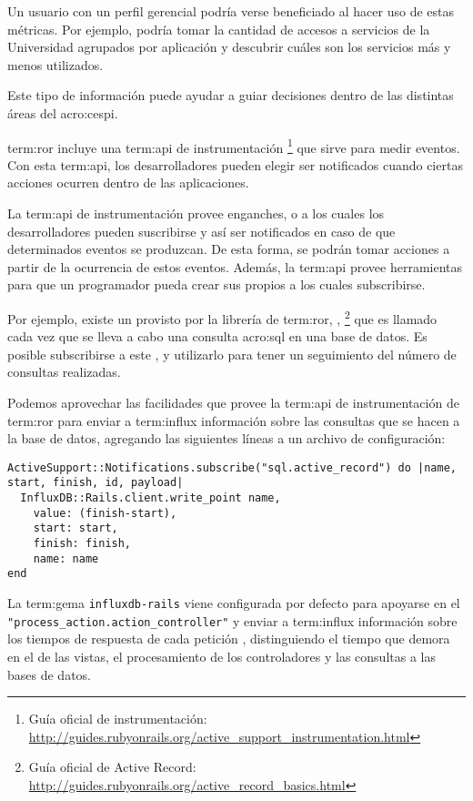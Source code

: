Un usuario con un perfil gerencial podría verse beneficiado al hacer uso de
estas métricas. Por ejemplo, podría tomar la cantidad de accesos a servicios de
la Universidad agrupados por aplicación y descubrir cuáles son los servicios
más y menos utilizados.

Este tipo de información puede ayudar a guiar decisiones dentro de las
distintas áreas del \gls{acro:cespi}.

\gls{term:ror} incluye una \gls{term:api} de instrumentación
\footnote{Guía oficial de instrumentación:
\url{http://guides.rubyonrails.org/active_support_instrumentation.html}}
que sirve para medir eventos. Con esta \gls{term:api}, los desarrolladores
pueden elegir ser notificados cuando ciertas acciones ocurren dentro de las
aplicaciones.

La \gls{term:api} de instrumentación provee enganches, o  a los
cuales los desarrolladores pueden suscribirse y así ser notificados en caso de
que determinados eventos se produzcan. De esta forma, se podrán tomar acciones
a partir de la ocurrencia de estos eventos. Además, la \gls{term:api} provee
herramientas para que un programador pueda crear sus propios  a los
cuales subscribirse.

Por ejemplo, existe un  provisto por la librería de \gls{term:ror},
,
\footnote{Guía oficial de Active Record:
\url{http://guides.rubyonrails.org/active_record_basics.html}} que es
llamado cada vez que se lleva a cabo una consulta \gls{acro:sql} en una base de datos. Es
posible subscribirse a este , y utilizarlo para tener un seguimiento
del número de consultas realizadas.

Podemos aprovechar las facilidades que provee la \gls{term:api} de
instrumentación de \gls{term:ror} para enviar a \gls{term:influx} información
sobre las consultas que se hacen a la base de datos, agregando las siguientes
líneas a un archivo de configuración:

\begin{lstlisting}
ActiveSupport::Notifications.subscribe("sql.active_record") do |name, start, finish, id, payload|
  InfluxDB::Rails.client.write_point name,
    value: (finish-start),
    start: start,
    finish: finish,
    name: name
end
\end{lstlisting}

La \gls{term:gema} \texttt{influxdb-rails} viene configurada por defecto para
apoyarse en el  \lstinline{"process_action.action_controller"} y enviar a
\gls{term:influx} información sobre los tiempos de respuesta de cada petición
, distinguiendo el tiempo que demora en el  de las vistas,
el procesamiento de los controladores y las consultas a las bases de datos.

